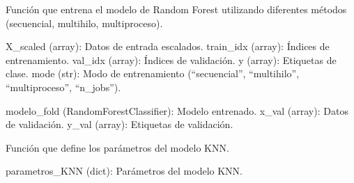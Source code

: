 \documentclass[letterpaper,10pt,spanish]{sphinxmanual}
\begin{document}
\begin{fulllineitems}
\label{\detokenize{Reduccion_Dimension:entrenar_modelos.entrenar_modelo_rfc}}
\pysigstartsignatures
\pysiglinewithargsret
{}
{\sphinxparamcomma {}\sphinxparamcomma {}\sphinxparamcomma {}\sphinxparamcomma {}}
{}
\pysigstopsignatures
\sphinxAtStartPar
Función que entrena el modelo de Random Forest utilizando diferentes métodos (secuencial, multihilo, multiproceso).
\begin{description}
\sphinxAtStartPar
X\_scaled (array): Datos de entrada escalados.
train\_idx (array): Índices de entrenamiento.
val\_idx (array): Índices de validación.
y (array): Etiquetas de clase.
mode (str): Modo de entrenamiento (“secuencial”, “multihilo”, “multiproceso”, “n\_jobs”).

\sphinxAtStartPar
modelo\_fold (RandomForestClassifier): Modelo entrenado.
x\_val (array): Datos de validación.
y\_val (array): Etiquetas de validación.

\end{description}

\end{fulllineitems}


\begin{fulllineitems}
\label{\detokenize{Reduccion_Dimension:entrenar_modelos.param_KNN}}
\pysigstartsignatures
\pysiglinewithargsret
{}
{}
{}
\pysigstopsignatures
\sphinxAtStartPar
Función que define los parámetros del modelo KNN.
\begin{description}
\sphinxAtStartPar
parametros\_KNN (dict): Parámetros del modelo KNN.

\end{description}

\end{fulllineitems}

\end{document}
